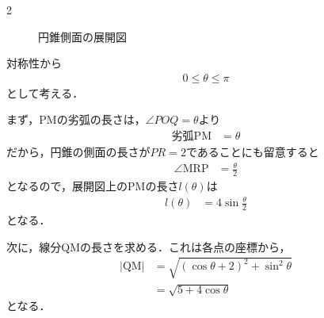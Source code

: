 \documentclass[../../main.tex]{subfiles}
\begin{document}
\begin{multicols}{2}
\begin{figure}[H]
    \caption{円錐側面の展開図}
    \label{2002-2:fig:3}
  \end{figure}

  対称性から
  \begin{align}
    0 \le \theta \le \pi \label{2002-2:eq:4}
  \end{align}
  として考える．

  まず，PMの劣弧の長さは，$\angle POQ=\theta$より
  \begin{align*}
    \text{劣弧PM} & = \theta
  \end{align*}
  だから，円錐の側面の長さが$PR=2$であることにも留意すると
  \begin{align*}
    \angle \text{MRP} & = \frac{\theta}{2}
  \end{align*}
  となるので，展開図上のPMの長さ$l(\theta)$は
  \begin{align}
    l(\theta) & = 4 \sin \frac{\theta}{2} \label{2002-2:eq:2}
  \end{align}
  となる．

  次に，線分QMの長さを求める．これは各点の座標から，
  \begin{align}
    |\text{QM}|
     & = \sqrt{(\cos\theta+2)^2 + \sin^2\theta}   \\
     & = \sqrt{5+4\cos\theta} \label{2002-2:eq:3}
  \end{align}
  となる．


\end{multicols}
\end{document}
